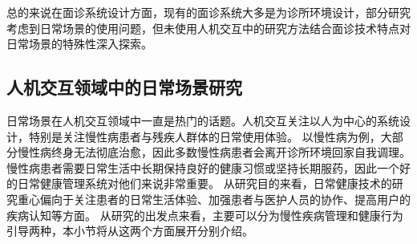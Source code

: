 

总的来说在面诊系统设计方面，现有的面诊系统大多是为诊所环境设计，部分研究考虑到日常场景的使用问题，但未使用人机交互中的研究方法结合面诊技术特点对日常场景的特殊性深入探索。

\subsection{人机交互领域中的日常场景研究}
\label{subsec:daily-health}

日常场景在人机交互领域中一直是热门的话题。人机交互关注以人为中心的系统设计，特别是关注慢性病患者与残疾人群体的日常使用体验。
以慢性病为例，大部分慢性病终身无法彻底治愈，因此多数慢性病患者会离开诊所环境回家自我调理。
慢性病患者需要日常生活中长期保持良好的健康习惯或坚持长期服药，因此一个好的日常健康管理系统对他们来说非常重要。
从研究目的来看，日常健康技术的研究重心偏向于关注患者的日常生活体验、加强患者与医护人员的协作、提高用户的疾病认知等方面\cite{nunes2015self-care}。
从研究的出发点来看，主要可以分为慢性疾病管理和健康行为引导两种\cite{nunes2015self-care}，本小节将从这两个方面展开分别介绍。

